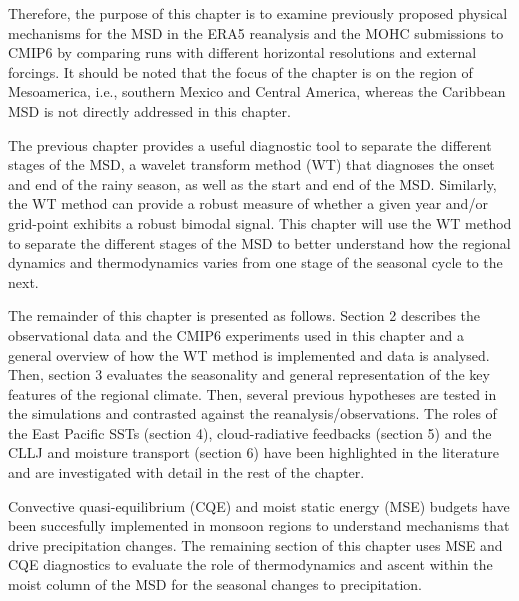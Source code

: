   Therefore, the purpose of this chapter is to examine previously proposed physical mechanisms for the MSD in the ERA5 reanalysis and the MOHC submissions to CMIP6 by comparing runs with different horizontal resolutions and external forcings. It should be noted that the focus of the chapter is on the region of Mesoamerica, i.e., southern Mexico and Central America, whereas the Caribbean MSD is not directly addressed in this chapter.

The previous chapter provides a useful diagnostic tool to separate the different stages of the MSD, a wavelet transform method (WT) that diagnoses the onset and end of the rainy season, as well as the start and end of the MSD. Similarly, the WT method can provide a robust measure of whether a given year and/or grid-point exhibits a robust bimodal signal. This chapter will use the WT method to separate the different stages of the MSD to better understand how the regional dynamics and thermodynamics varies from one stage of the seasonal cycle to the next. 

The remainder of this chapter is presented as follows. Section 2 describes the observational data and the CMIP6 experiments used in this chapter and a general overview of how the WT method is implemented and data is analysed. Then, section 3 evaluates the seasonality and general representation of the key features of the regional climate.
Then, several previous hypotheses are tested in the simulations and contrasted against the reanalysis/observations. 
The roles of the East Pacific SSTs (section 4), cloud-radiative feedbacks (section 5) and the CLLJ and moisture transport (section 6) have been highlighted in the literature and are investigated with detail in the rest of the chapter.
  





Convective quasi-equilibrium (CQE) and moist static energy (MSE) budgets have been succesfully implemented in monsoon regions to understand mechanisms that drive precipitation changes. The remaining section of this chapter uses MSE and CQE diagnostics to evaluate the role of thermodynamics and ascent within the moist column of the MSD for the seasonal changes to precipitation. 


